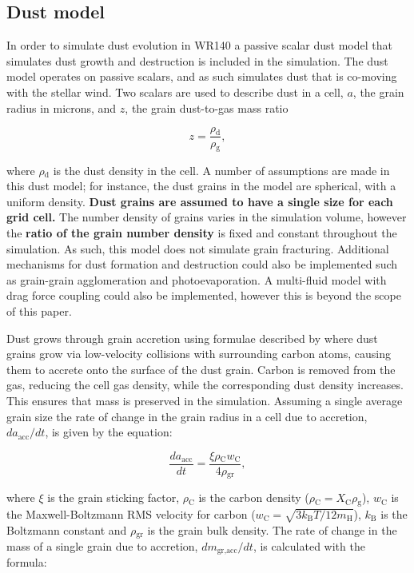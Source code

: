 \documentclass[fleqn,usenatbib]{mnras}
\newcommand{\rms}[1]{\ensuremath{_{\text{#1}}}}
\begin{document}
\subsection{Dust model}
\label{sec:dust-model}

In order to simulate dust evolution in WR140 a passive scalar dust model that simulates dust growth and destruction is included in the simulation.
The dust model operates on passive scalars, and as such simulates dust that is co-moving with the stellar wind.
Two scalars are used to describe dust in a cell, $a$, the grain radius in microns, and $z$, the grain dust-to-gas mass ratio

\begin{equation}
  z = \frac{\rho\rms{d}}{\rho\rms{g}},
  \label{eq:p2-z}
\end{equation}

\noindent
where $\rho\rms{d}$ is the dust density in the cell.
A number of assumptions are made in this dust model; for instance, the dust grains in the model are spherical, with a uniform density.
\textbf{Dust grains are assumed to have a single size for each grid cell.}
The number density of grains varies in the simulation volume, however the \textbf{ratio of the grain number density} is fixed and constant throughout the simulation.
As such, this model does not simulate grain fracturing.
Additional mechanisms for dust formation and destruction could also be implemented such as grain-grain agglomeration and photoevaporation.
A multi-fluid model with drag force coupling could also be implemented, however this is beyond the scope of this paper.

Dust grows through grain accretion using formulae described by \cite{spitzer_jr._physical_2008} where dust grains grow via low-velocity collisions with surrounding carbon atoms, causing them to accrete onto the surface of the dust grain.
Carbon is removed from the gas, reducing the cell gas density, while the corresponding dust density increases.
This ensures that mass is preserved in the simulation.
Assuming a single average grain size the rate of change in the grain radius in a cell due to accretion, $da\rms{acc}/dt$, is given by the equation:

\begin{equation}
  \frac{da\rms{acc}}{dt} = \frac{\xi \rho\rms{C} w\rms{C}}{4\rho\rms{gr}},
\end{equation}

\noindent
where $\xi$ is the grain sticking factor, $\rho\rms{C}$ is the carbon density ($\rho\rms{C} = X\rms{C} \rho\rms{g}$), $w\rms{C}$ is the Maxwell-Boltzmann RMS velocity for carbon ($w\rms{C} = \sqrt{3k\rms{B} T / 12m\rms{H}}$), $k\rms{B}$ is the Boltzmann constant and $\rho\rms{gr}$ is the grain bulk density.
The rate of change in the mass of a single grain due to accretion, $dm\rms{gr,acc}/dt$, is calculated with the formula:
\end{document}
